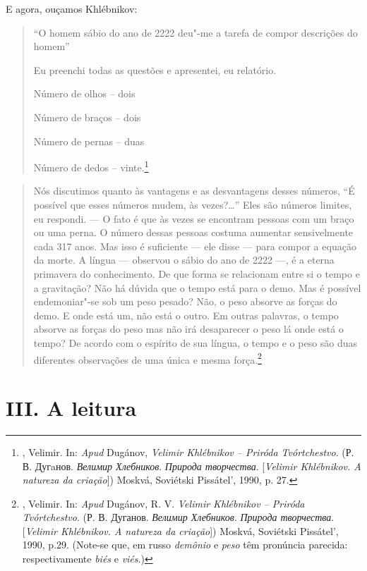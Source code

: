 E agora, ouçamos Khlébnikov:

\begin{quote}
``O homem sábio do ano de 2222 deu"-me a tarefa de compor descrições do
homem''

Eu preenchi todas as questões e apresentei, eu relatório.

Número de olhos -- dois

Número de braços -- dois

Número de pernas -- duas

Número de dedos -- vinte.\footnote{, Velimir. In: \emph{Apud}
  Dugánov,  \emph{Velimir Khlébnikov -- Priróda Tvórtchestvo}. (Р.
  В. Дугaнов. \emph{Велимир Хлебников}. \emph{Природа творчества}.
  [\emph{Velimir Khlébnikov. A natureza da criação}]) Moskvá,
  Soviétski Pissátel', 1990, p. 27.}
  \end{quote}



\begin{quote}
Nós discutimos quanto às vantagens e as desvantagens desses números, ``É
possível que esses números mudem, às vezes?\ldots{}'' Eles são números
limites, eu respondi. --- O fato é que às vezes se encontram pessoas com
um braço ou uma perna. O número dessas pessoas costuma aumentar
sensivelmente cada 317 anos. Mas isso é suficiente --- ele disse --- para
compor a equação da morte. A língua --- observou o sábio do ano de 2222 ---,
é a eterna primavera do conhecimento. De que forma se relacionam entre
si o tempo e a gravitação? Não há dúvida que o tempo está para o demo.
Mas é possível endemoniar"-se sob um peso pesado? Não, o peso absorve as
forças do demo. E onde está um, não está o outro. Em outras palavras, o
tempo absorve as forças do peso mas não irá desaparecer o peso lá onde
está o tempo? De acordo com o espírito de sua língua, o tempo e o peso
são duas diferentes observações de uma única e mesma força.\footnote{,
  Velimir. In: \emph{Apud} Dugánov, R. V. \emph{Velimir Khlébnikov --
  Priróda Tvórtchestvo}. (Р. В. Дуганов. \emph{Велимир
  Хлебников}. \emph{Природа творчества}. [\emph{Velimir Khlébnikov. A
  natureza da criação}]) Moskvá, Soviétski Pissátel', 1990, p.29. (Note-se que, em russo \emph{demônio} e \emph{peso} têm pronúncia
  parecida: respectivamente \emph{biés} e \emph{viés}.)}
\end{quote}

\section{III. A leitura}

